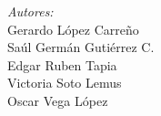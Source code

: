 \documentclass[12pt]{article}
\makeatletter
\let\theauthor\@author
\makeatother
\begin{document}
\begin{titlepage}
\begin{minipage}{0.4\textwidth}
    \begin{flushright} \large
      \emph{Autores:} \\
      Gerardo López Carreño \\
      Saúl Germán Gutiérrez C. \\
      Edgar Ruben Tapia \\
      Victoria Soto Lemus \\
      Oscar Vega López\\
    \end{flushright}
    
  \end{minipage}\\[2 cm]
     
\end{titlepage}


\pagebreak

 
% 

\printbibliography
\end{document}
